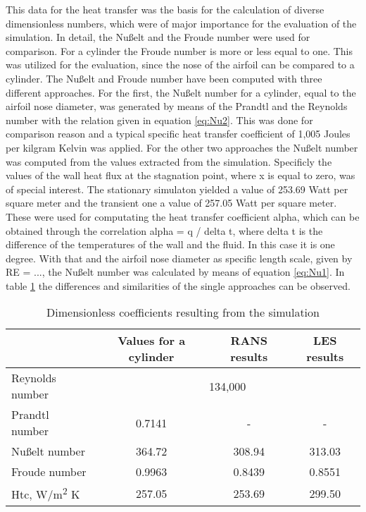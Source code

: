This data for the heat transfer was the basis for the calculation of diverse dimensionless numbers, which were of major importance for the evaluation of the simulation.
In detail, the Nußelt and the Froude number were used for comparison. For a cylinder the Froude number is more or less equal to one. This was utilized for the evaluation, since the nose of the airfoil can be compared to a cylinder.
The Nußelt and Froude number have been computed with three different approaches. For the first, the Nußelt number for a cylinder, equal to the airfoil nose diameter, was generated by means of the Prandtl and the Reynolds number with the relation given in equation \ref{eq:Nu2}. This was done for comparison reason and a typical specific heat transfer coefficient of 1,005 Joules per kilgram Kelvin was applied.
For the other two approaches the Nußelt number was computed from the values extracted from the simulation. Specificly the values of the wall heat flux at the stagnation point, where x is equal to zero, was of special interest. The stationary simulaton yielded a value of 253.69 Watt per square meter and the transient one a value of 257.05 Watt per square meter. These were used  for computating the heat transfer coefficient alpha, which can be obtained through the correlation
alpha = q / delta t, 
where delta t is the difference of the temperatures of the wall and the fluid. In this case it is one degree. With that and the airfoil nose diameter as specific length scale, given by
RE = ...,
the Nußelt number was calculated by means of equation \ref{eq:Nu1}.
In table \ref{tab:coefficients} the differences and similarities of the single approaches can be observed.

\begin{table}[h]
\centering
\caption{Dimensionless coefficients resulting from the simulation}
\label{tab:coefficients}
\begin{tabular}{l | ccc}
&Values for a cylinder&RANS results&LES results\\
\hline
Reynolds number&\multicolumn{3}{c}{134,000}\\
Prandtl number&0.7141&-&-\\
Nußelt number&364.72&308.94&313.03\\
Froude number&0.9963&0.8439&0.8551\\
Htc, W/m\textsuperscript{2} K&257.05&253.69&299.50\\
\end{tabular}
\end{table}